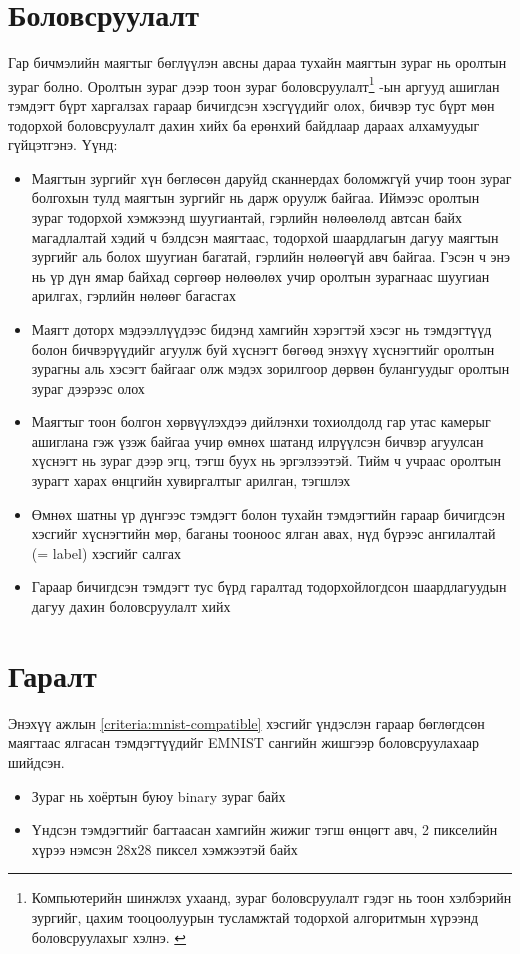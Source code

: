 \section{Боловсруулалт}
\label{section:processing}

Гар бичмэлийн маягтыг бөглүүлэн авсны дараа тухайн маягтын зураг нь оролтын зураг болно. Оролтын зураг дээр тоон зураг боловсруулалт\footnote{Компьютерийн шинжлэх ухаанд, зураг боловсруулалт гэдэг нь тоон хэлбэрийн зургийг, цахим тооцоолуурын тусламжтай тодорхой алгоритмын хүрээнд боловсруулахыг хэлнэ. \cite{image-processing}} -ын аргууд ашиглан тэмдэгт бүрт харгалзах гараар бичигдсэн хэсгүүдийг олох, бичвэр тус бүрт мөн тодорхой боловсруулалт дахин хийх ба ерөнхий байдлаар дараах алхамуудыг гүйцэтгэнэ. Үүнд:

\begin{itemize}
	\item Маягтын зургийг хүн бөглөсөн даруйд сканнердах боломжгүй учир тоон зураг болгохын тулд маягтын зургийг нь дарж оруулж байгаа. Иймээс оролтын зураг тодорхой хэмжээнд шуугиантай, гэрлийн нөлөөлөлд автсан байх магадлалтай хэдий ч бэлдсэн маягтаас, тодорхой шаардлагын дагуу маягтын зургийг аль болох шуугиан багатай, гэрлийн нөлөөгүй авч байгаа. Гэсэн ч энэ нь үр дүн ямар байхад сөргөөр нөлөөлөх учир оролтын зурагнаас шуугиан арилгах, гэрлийн нөлөөг багасгах
	\item Маягт доторх мэдээллүүдээс бидэнд хамгийн хэрэгтэй хэсэг нь тэмдэгтүүд болон бичвэрүүдийг агуулж буй хүснэгт бөгөөд энэхүү хүснэгтийг оролтын зурагны аль хэсэгт байгааг олж мэдэх зорилгоор дөрвөн булангуудыг оролтын зураг дээрээс олох
	\item Маягтыг тоон болгон хөрвүүлэхдээ дийлэнхи тохиолдолд гар утас камерыг ашиглана гэж үзэж байгаа учир өмнөх шатанд илрүүлсэн бичвэр агуулсан хүснэгт нь зураг дээр эгц, тэгш буух нь эргэлзээтэй. Тийм ч учраас оролтын зурагт харах өнцгийн хувиргалтыг арилган, тэгшлэх
	\item Өмнөх шатны үр дүнгээс тэмдэгт болон тухайн тэмдэгтийн гараар бичигдсэн хэсгийг хүснэгтийн мөр, баганы тооноос ялган авах, нүд бүрээс ангилалтай (= label) хэсгийг салгах
	\item Гараар бичигдсэн тэмдэгт тус бүрд гаралтад тодорхойлогдсон шаардлагуудын дагуу дахин боловсруулалт хийх
\end{itemize}

\section{Гаралт}

Энэхүү ажлын \ref{criteria:mnist-compatible} хэсгийг үндэслэн гараар бөглөгдсөн маягтаас ялгасан тэмдэгтүүдийг EMNIST сангийн жишгээр боловсруулахаар шийдсэн.

\begin{itemize}
	\item Зураг нь хоёртын буюу binary зураг байх
	\item Үндсэн тэмдэгтийг багтаасан хамгийн жижиг тэгш өнцөгт авч, 2 пикселийн хүрээ нэмсэн 28х28 пиксел хэмжээтэй байх
\end{itemize}